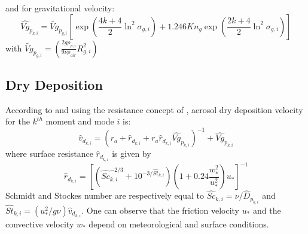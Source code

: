 and for gravitational velocity: 
\begin{equation}
\hat{Vg}_{p_{k,i}} = \tilde{Vg}_{p_{g,i}}\left[\exp\left(\frac{4k+4}{2} 
\ln^2\sigma_{g,i} \right) + 1.246 Kn_g \exp \left(\frac{2k+4}{2} 
\ln^2\sigma_{g,i}\right) \right]
\label{gravi_vel}
\end{equation}
with $\tilde{Vg}_{p_{g,i}} = \left(\frac{2g \rho_{p,i}}{9 \nu \rho_{air}} 
R_{g,i}^2 \right)$

\subsection{Dry Deposition}
According to \citet{Seinfeld-1997} and using the resistance concept of 
\citet{Wesely-1989}, aerosol dry deposition
velocity for the $k^{th}$ moment and mode $i$ is:
\begin{equation}
\hat{v}_{d_{k,i}} = ( r_a + \hat{r}_{d_{k,i}} + r_a  \hat{r}_{d_{k,i}} 
\hat{Vg}_{p_{k,i}})^{-1} + \hat{Vg}_{p_{k,i}}
\label{gravi_vel}
\end{equation}
where surface resistance $\hat{r}_{d_{k,i}}$ is given by
\begin{equation}
\hat{r}_{d_{k,i}} = \left[(\hat{Sc}_{k,i}^{-2/3} + 10^{-3/\hat{St}_{k,i}}) 
\left(1+ 0.24 \frac{w_*^2}{u_*^2} \right) u_* \right]^{-1}
\label{surfres}
\end{equation}
Schmidt and Stockes number are respectively equal to $\hat{Sc}_{k,i} = \nu / 
\hat{D}_{p_{k,i}}$ and
$\hat{St}_{k,i}= (u_*^2/g\nu)\hat{v}_{d_{k,i}}$.
One can observe that the friction velocity $u_*$ and the convective velocity 
$w_*$ depend on meteorological
and surface conditions. 

